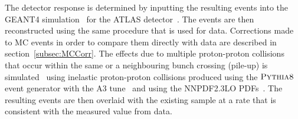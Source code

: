 The detector response is determined by inputting the resulting events into the GEANT4 simulation~\cite{Agostinelli2003250} for the ATLAS detector~\cite{Aad:2010ah}. The events are then reconstructed using the same procedure that is used for data. Corrections made to MC events in order to compare them directly with data are described in section~\ref{subsec:MCCorr}.
The effects due to multiple proton-proton collisions that occur within the same or a neighbouring bunch crossing (pile-up) is simulated~\cite{Marshall:2014mza} using inelastic proton-proton collisions produced using the $\textsc{Pythia8}$ event generator with the A3 tune~\cite{ATLAS:2016puo} and using the NNPDF2.3LO PDFs~\cite{Ball:2012cx}. The resulting events are
then overlaid with the existing sample at a rate that is consistent with the measured value from data.

